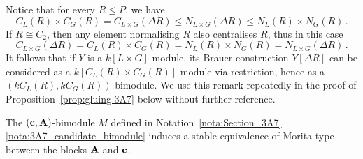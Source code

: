 \begin{rem}
Notice that for every $R\leq P$, we have
\[
C_L(R)\times C_G(R)=C_{L\times G}(\Delta R)
\leq 
N_{L\times G}(\Delta R)
\leq N_L(R)\times N_G(R)\,.
\]
If $R\cong C_2$, then any element normalising $R$ also centralises $R$, thus in this case 
\[
C_{L\times G}(\Delta R)
=C_L(R)\times C_G(R) 
= N_L(R)\times N_G(R) 
=N_{L\times G}(\Delta R)\,.
\]
It follows that if $Y$ is a $k[L\times G]$-module, its Brauer construction $Y[\Delta R]$ can be considered as a $k[C_L(R)\times C_G(R)]$-module via restriction, hence as a $(kC_L(R),kC_G(R))$-bimodule.
We use this remark repeatedly in the proof of Proposition~\ref{prop:gluing-3A7} below without further reference.
\end{rem}


\begin{prop}\label{prop:gluing-3A7}
The $({\mathbf{c}},{\mathbf{A}})$-bimodule $M$  defined in Notation~\ref{nota:Section_3A7}{\rm\ref{nota:3A7_candidate_bimodule}} induces a stable equivalence of Morita type between the blocks ${\mathbf{A}}$ and ${\mathbf{c}}$. 
\end{prop}
%
